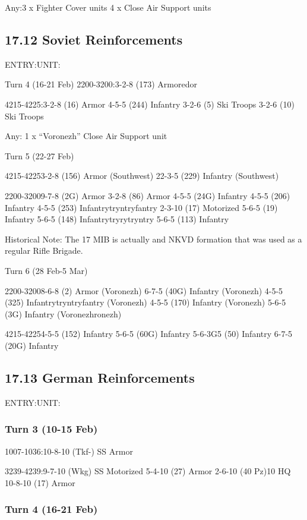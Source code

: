 \documentclass[10pt]{article}
\begin{document}
Any:3 x       Fighter Cover units
4 x Close Air Support units

\subsection*{17.12 Soviet Reinforcements}

ENTRY:UNIT:


Turn 4 (16-21 Feb)
2200-3200:3-2-8 (173) Armoredor

4215-4225:3-2-8 (16) Armor
4-5-5 (244) Infantry
3-2-6 (5) Ski           Troops
3-2-6 (10) Ski Troops

Any: 1 x “Voronezh” Close Air Support unit

Turn 5 (22-27 Feb)

4215-42253-2-8 (156) Armor (Southwest)
22-3-5 (229) Infantry (Southwest)

2200-32009-7-8 (2G) Armor
3-2-8 (86) Armor
4-5-5 (24G) Infantry
4-5-5 (206) Infantry
4-5-5 (253) Infantrytryntryfantry
2-3-10 (17) Motorized
5-6-5 (19) Infantry
5-6-5 (148) Infantrytryrytryntry
5-6-5 (113) Infantry

Historical Note: The 17 MIB is actually and NKVD formation that was used as a
regular Rifle Brigade.

Turn 6 (28 Feb-5 Mar)

2200-32008-6-8 (2) Armor (Voronezh)
6-7-5 (40G) Infantry (Voronezh)
4-5-5 (325) Infantrytryntryfantry (Voronezh)
4-5-5 (170) Infantry (Voronezh)
5-6-5 (3G) Infantry (Voronezhronezh)

4215-42254-5-5 (152) Infantry
5-6-5 (60G) Infantry
5-6-3G5 (50) Infantry
6-7-5 (20G) Infantry

\subsection*{17.13 German Reinforcements}

        ENTRY:UNIT:

\subsubsection*{Turn 3 (10-15 Feb)}

1007-1036:10-8-10 (Tkf-) SS Armor

      3239-4239:9-7-10 (Wkg) SS Motorized
5-4-10 (27) Armor
2-6-10 (40 Pz)10 HQ
10-8-10 (17) Armor

\subsubsection*{Turn 4 (16-21 Feb)}
\end{document}
